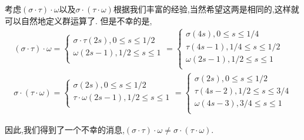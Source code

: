 \documentclass{article}
\begin{document}
考虑$(\sigma \cdot \tau)\cdot \omega$以及$\sigma \cdot(\tau \cdot \omega)$根据我们丰富的经验,当然希望这两是相同的,这样就可以自然地定义群运算了.
但是不幸的是,
\begin{eqnarray*}
    (\sigma \cdot \tau)\cdot \omega = 
    \left\{
        \begin{array}{c}
            \sigma \cdot \tau(2s) , 0\leq s \leq 1/2\\
            \omega(2s-1), 1/2 \leq s \leq 1\\
        \end{array}
    \right.
    =
    \left\{
        \begin{array}{c}
            \sigma(4s),0\leq s \leq 1/4\\
            \tau(4s - 1),1/4 \leq s \leq 1/2\\
            \omega(2s - 1), 1/2 \leq s \leq 1\\
        \end{array}
    \right.\\
    \sigma \cdot (\tau\cdot \omega) = 
    \left\{
        \begin{array}{c}
            \sigma(2s) , 0\leq s \leq 1/2\\
            \tau \cdot \omega(2s-1), 1/2 \leq s \leq 1\\
        \end{array}
    \right.
    =
    \left\{
        \begin{array}{c}
            \sigma(2s),0\leq s \leq 1/2\\
            \tau(4s - 2),1/2 \leq s \leq 3/4\\
            \omega(4s - 3), 3/4 \leq s \leq 1\\
        \end{array}
    \right.
\end{eqnarray*}

因此,我们得到了一个不幸的消息,$(\sigma \cdot \tau)\cdot \omega \neq \sigma \cdot (\tau \cdot \omega)$.
\end{document}
